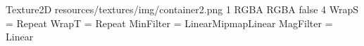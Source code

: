 Texture2D
resources/textures/img/container2.png
1
RGBA
RGBA
false
4
WrapS = Repeat
WrapT = Repeat
MinFilter = LinearMipmapLinear
MagFilter = Linear